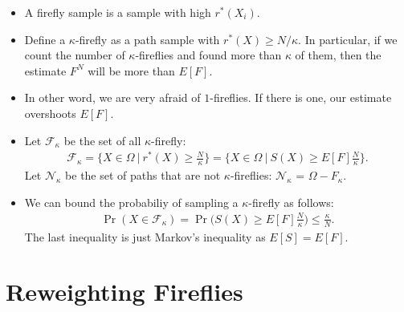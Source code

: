 \documentclass[10pt]{article}
\begin{document}
\begin{itemize}
  	\item A firefly sample is a sample with high $r^*(X_i)$.

  	\item Define a $\kappa$-firefly as a path sample with $r^*(X) \geq N/\kappa$. In particular, if we count the number of $\kappa$-fireflies and found more than $\kappa$ of them, then the estimate $F^N$ will be more than $E[F]$. 

  	\item In other word, we are very afraid of $1$-fireflies. If there is one, our estimate overshoots $E[F]$.

  	\item Let $\mathcal{F}_\kappa$ be the set of all $\kappa$-firefly:
  	\begin{align*}
  		\mathcal{F}_\kappa 
  		= \bigg\{ X \in \Omega\ \bigg|\ r^*(X) \geq \frac{N}{\kappa} \bigg\}
  		= \bigg\{ X \in \Omega\ \bigg|\ S(X) \geq E[F] \frac{N}{\kappa} \bigg\}.
  	\end{align*}
  	Let $\mathcal{N}_\kappa$ be the set of paths that are not $\kappa$-fireflies: $\mathcal{N}_\kappa$ = $\Omega - F_{\kappa}$.

  	\item We can bound the probabiliy of sampling a $\kappa$-firefly as follows:
  	\begin{align*}
  	\Pr(X \in \mathcal{F}_\kappa)
  	= \Pr\bigg(S(X) 
  	\geq E[F] \frac{N}{\kappa} \bigg)
  	\leq \frac{\kappa}{N}.
  	\end{align*}
  	The last inequality is just Markov's inequality as $E[S] = E[F]$.
  \end{itemize}
  
  \section{Reweighting Fireflies}
\end{document}
